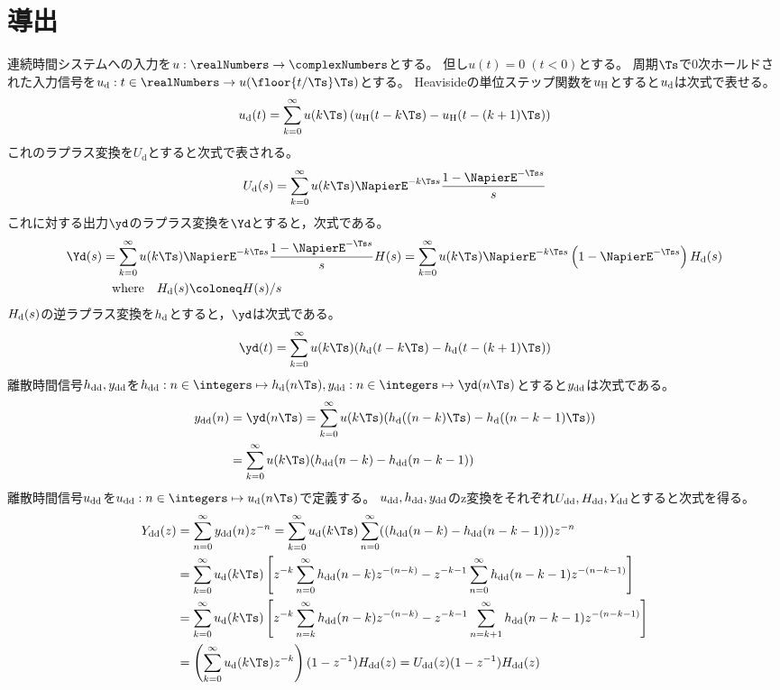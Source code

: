     \section{導出}
        連続時間システムへの入力を$u:\realNumbers\to\complexNumbers$とする。
        但し$u(t)=0\;(t<0)$とする。
        周期$\Ts$で0次ホールドされた入力信号を$\ud:t\in\realNumbers\to u(\floor{t/\Ts}\Ts)$とする。
        Heavisideの単位ステップ関数を$u_\text{H}$とすると$u_\text{d}$は次式で表せる。
        \[ \ud(t) = \sum_{k=0}^\infty u(k\Ts)\left(\uH(t-k\Ts) - \uH(t-(k+1)\Ts)\right) \]
        これのラプラス変換を$U_\text{d}$とすると次式で表される。
        \[ \Ud(s) = \sum_{k=0}^\infty u(k\Ts)\NapierE^{-k\Ts s}\frac{1-\NapierE^{-\Ts s}}{s} \]
        これに対する出力$\yd$のラプラス変換を$\Yd$とすると，次式である。
        \begin{align*}
            \Yd(s) &= \sum_{k=0}^\infty u(k\Ts)\NapierE^{-k\Ts s}\frac{1-\NapierE^{-\Ts s}}{s}H(s) = \sum_{k=0}^\infty u(k\Ts)\NapierE^{-k\Ts s}\left(1-\NapierE^{-\Ts s}\right)\Hd(s) \\
            &\phantom{=} \text{where} \quad \Hd(s) \coloneq H(s)/s
        \end{align*}
        $H_\text{d}(s)$の逆ラプラス変換を$h_\text{d}$とすると，$\yd$は次式である。
        \[ \yd(t) = \sum_{k=0}^\infty u(k\Ts)(\hd(t-k\Ts)-\hd(t-(k+1)\Ts)) \]
        離散時間信号$h_\text{dd},y_\text{dd}$を$\hdd:n\in\integers\mapsto \hd(n\Ts),\ydd:n\in\integers\mapsto \yd(n\Ts)$とすると$y_\text{dd}$は次式である。
        \begin{align*}
            \ydd(n) &= \yd(n\Ts) = \sum_{k=0}^\infty u(k\Ts)(\hd((n-k)\Ts)-\hd((n-k-1)\Ts)) \\
            &= \sum_{k=0}^\infty u(k\Ts)(\hdd(n-k)-\hdd(n-k-1))
        \end{align*}
        離散時間信号$u_\text{dd}$を$\udd:n\in\integers\mapsto\ud(n\Ts)$で定義する。
        $u_\text{dd},h_\text{dd},y_\text{dd}$のz変換をそれぞれ$U_\text{dd},H_\text{dd},Y_\text{dd}$とすると次式を得る。
        \begin{align*}
            \Ydd(z) &= \sum_{n=0}^\infty \ydd(n) z^{-n} = \sum_{k=0}^\infty \ud(k\Ts) \sum_{n=0}^\infty ((\hdd(n-k)-\hdd(n-k-1))) z^{-n} \\
            &= \sum_{k=0}^\infty \ud(k\Ts)\left[z^{-k}\sum_{n=0}^\infty \hdd(n-k)z^{-(n-k)} - z^{-k-1}\sum_{n=0}^\infty \hdd(n-k-1)z^{-(n-k-1)}\right] \\
            &= \sum_{k=0}^\infty \ud(k\Ts)\left[z^{-k}\sum_{n=k}^\infty \hdd(n-k)z^{-(n-k)} - z^{-k-1}\sum_{n=k+1}^\infty \hdd(n-k-1)z^{-(n-k-1)}\right] \\
            &= \left(\sum_{k=0}^\infty \ud(k\Ts)z^{-k}\right)(1-z^{-1})\Hdd(z) = \Udd(z)(1-z^{-1})\Hdd(z)
        \end{align*}
